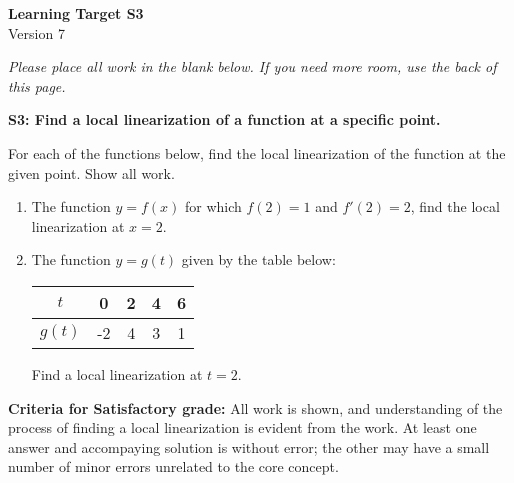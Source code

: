 \documentclass[10pt]{article}
\begin{document}
	\vspace*{0in}

		\begin{center}
			\textbf{Learning Target S3} \\
			{Version 7} \\
		\end{center}

\emph{Please place all work in the blank below. If you need more room, use the back of this page.}

\begin{framed}
	\textbf{S3: Find a local linearization of a function at a specific point.}
\end{framed}

For each of the functions below, find the local linearization of the function at the given point. Show all work. 

\begin{enumerate}
    \item The function $y = f(x)$ for which $f(2) = 1$ and $f'(2) = 2$, find the local linearization at $x=2$.
    
    \item The function $y = g(t)$ given by the table below: 
    \begin{center}
            \begin{tabular}{c||c|c|c|c|}
        $t$ &  0 & 2 & 4 & 6  \\ \hline 
        $g(t)$ & -2 & 4 & 3 & 1 
    \end{tabular}
    \end{center}
    Find a local linearization at $t = 2$. 

    
    
\end{enumerate}



\vfill


\begin{small}
    \begin{framed}
        	\textbf{Criteria for Satisfactory grade:} All work is shown, and understanding of the process of finding a local linearization is evident from the work. At least one answer and accompaying solution is without error; the other may have a small number of minor errors unrelated to the core concept. 
    \end{framed}

\end{small}
\end{document}
